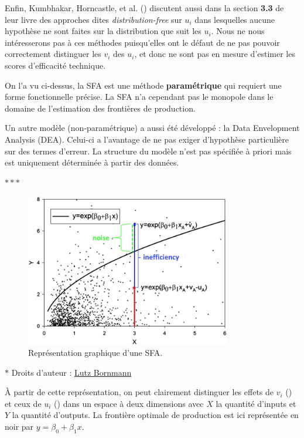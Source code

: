 \documentclass[
  12pt,
]{report}
\renewcommand{\texttt}[1]{\colorbox{light}{\color{highlight}{\ttfamily{#1}}}}
\newcommand{\macrostars}{
    \vspace{2em}
    \begin{center}
        \textcolor{highlight!80!black}{\Large{$\ast\ast\ast$}}
    \end{center}
}
\begin{document}
Enfin, Kumbhakar, Horncastle, et al.
() discutent aussi dans la section
\textbf{3.3} de leur livre des approches dites \emph{distribution-free}
sur \(u_i\) dans lesquelles aucune hypothèse ne sont faites sur la
distribution que suit les \(u_i\). Nous ne nous intéresserons pas à ces
méthodes puisqu'elles ont le défaut de ne pas pouvoir correctement
distinguer les \(v_i\) des \(u_i\), et donc ne sont pas en mesure
d'estimer les scores d'efficacité technique.

\newpage

On l'a vu ci-dessus, la SFA est une méthode \textbf{paramétrique} qui
requiert une forme fonctionnelle précise. La SFA n'a cependant pas le
monopole dans le domaine de l'estimation des frontières de production.

Un autre modèle (non-paramétrique) a aussi été développé : la Data
Envelopment Analysis (DEA). Celui-ci a l'avantage de ne pas exiger
d'hypothèse particulière sur des termes d'erreur. La structure du modèle
n'est pas spécifiée à priori mais est uniquement déterminée à partir des
données.

\macrostars
\vspace{2em}

\begin{figure}[htbp]
    \centering
    \includegraphics[width=0.8\textwidth]{imgs/stochastic_image.jpeg}
    \caption{Représentation graphique d'une SFA.}
    \label{fig:example}
\end{figure}

\(*\) Droits d'auteur :
\href{https://www.researchgate.net/profile/Lutz-Bornmann}{Lutz Bornmann}

À partir de cette représentation, on peut clairement distinguer les
effets de \(v_i\) (\texttt{noise}) et ceux de \(u_i\)
(\texttt{inefficiency}) dans un espace à deux dimensions avec \(X\) la
quantité d'inputs et \(Y\) la quantité d'outputs. La frontière optimale
de production est ici représentée en noir par
\(y = \beta_0 + \beta_1x\).
\end{document}
